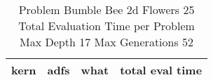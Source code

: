 \begin{table}[H]
\caption{Problem  Bumble Bee 2d  Flowers 25\\Total Evaluation Time per Problem \\ Max Depth 17 Max Generations 52\\}
\begin{center}
\scalebox{1.0} %
{
\begin{tabular}{lllr}
\hline
kern & adfs & what & total eval time \\
\hline


\end{tabular}
}
\end{center}
\end{table}

